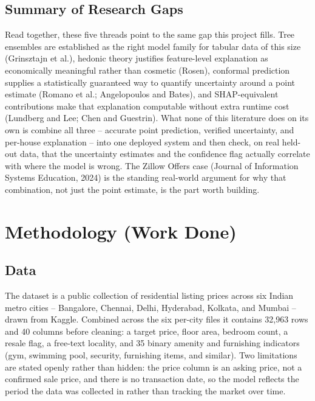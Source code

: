 \documentclass[12pt]{report}
\begin{document}
\section{Summary of Research Gaps}
Read together, these five threads point to the same gap this project fills. Tree
ensembles are established as the right model family for tabular data of this size
(Grinsztajn et al.), hedonic theory justifies feature-level explanation as
economically meaningful rather than cosmetic (Rosen), conformal prediction supplies a
statistically guaranteed way to quantify uncertainty around a point estimate (Romano
et al.; Angelopoulos and Bates), and SHAP-equivalent contributions make that
explanation computable without extra runtime cost (Lundberg and Lee; Chen and
Guestrin). What none of this literature does on its own is combine all three --
accurate point prediction, verified uncertainty, and per-house explanation -- into one
deployed system and then check, on real held-out data, that the uncertainty estimates
and the confidence flag actually correlate with where the model is wrong. The Zillow
Offers case (Journal of Information Systems Education, 2024) is the standing
real-world argument for why that combination, not just the point estimate, is the part
worth building.

\chapter{Methodology (Work Done)}

\section{Data}
The dataset is a public collection of residential listing prices across six Indian
metro cities -- Bangalore, Chennai, Delhi, Hyderabad, Kolkata, and Mumbai -- drawn
from Kaggle. Combined across the six per-city files it contains 32{,}963 rows and 40
columns before cleaning: a target price, floor area, bedroom count, a resale flag, a
free-text locality, and 35 binary amenity and furnishing indicators (gym,
swimming pool, security, furnishing items, and similar). Two limitations are stated
openly rather than hidden: the price column is an asking price, not a confirmed sale
price, and there is no transaction date, so the model reflects the period the data
was collected in rather than tracking the market over time.
\end{document}
